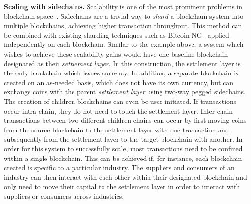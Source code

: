 \noindent
\textbf{Scaling with sidechains. } Scalability is one of the most prominent
problems in blockchain space~\cite{bitcoinng,sompolinsky2013accelerating}.
Sidechains are a trivial way to \emph{shard} a blockchain system into multiple
blockchains, achieving higher transaction throughput. This method can be
combined with existing sharding techniques such as Bitcoin-NG~\cite{bitcoinng}
applied independently on each blockchain. Similar to the example above, a system
which wishes to achieve these scalability gains would have one baseline
blockchain designated as their \emph{settlement layer}. In this construction,
the settlement layer is the only blockchain which issues currency. In addition,
a separate blockchain is created on an as-needed basis, which does not have its
own currency, but can exchange coins with the parent \emph{settlement layer}
using two-way pegged sidechains. The creation of children blockchains can even
be user-initiated. If transactions occur intra-chain, they do not need to touch
the settlement layer. Inter-chain transactions between two different children
chains can occur by first moving coins from the source blockchain to the
settlement layer with one transaction and subsequently from the settlement layer
to the target blockchain with another. In order for this system to successfully
scale, most transactions need to be confined within a single blockchain. This
can be achieved if, for instance, each blockchain created is specific to a
particular industry. The suppliers and consumers of an industry can then
interact with each other within their designated blockchain and only need to
move their capital to the settlement layer in order to interact with suppliers
or consumers across industries.

